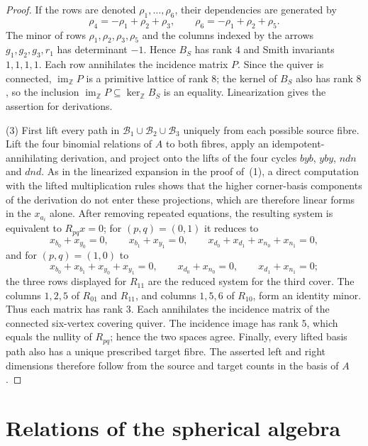 \documentclass[11pt]{amsart}
\theoremstyle{plain}
\theoremstyle{definition}
\newcommand{\ZZ}{\mathbb{Z}}
\begin{document}
\begin{proof}
If the rows are denoted $\rho_1,\ldots,\rho_6$, their dependencies are generated by
\[
 \rho_4=-\rho_1+\rho_2+\rho_3,\qquad \rho_6=-\rho_1+\rho_2+\rho_5.
\]
The minor of rows $\rho_1,\rho_2,\rho_3,\rho_5$ and the columns indexed by the arrows $g_1,g_2,g_3,r_1$ has
determinant $-1$. Hence $B_S$ has rank $4$ and Smith invariants $1,1,1,1$. Each row annihilates the incidence
matrix $P$. Since the quiver is connected, $\operatorname{im}_\ZZ P$ is a primitive lattice of rank $8$; the
kernel of $B_S$ also has rank $8$, so the inclusion $\operatorname{im}_\ZZ P\subseteq\ker_\ZZ B_S$ is an
equality. Linearization gives the assertion for derivations.

(3) First lift every path in $\mathcal B_1\cup\mathcal B_2\cup\mathcal B_3$ uniquely from each possible source
fibre. Lift the four binomial relations of $A$ to both fibres, apply an idempotent-annihilating derivation,
and project onto the lifts of the four cycles $byb$, $yby$, $ndn$ and $dnd$. As in the linearized expansion in
the proof of~(1), a direct computation with the lifted multiplication rules shows that the higher corner-basis
components of the derivation do not enter these projections, which are therefore linear forms in the $x_{a_i}$
alone. After removing repeated equations, the resulting system is equivalent to $R_{pq}x=0$; for $(p,q)=(0,1)$
it reduces to
\[
 x_{b_0}+x_{y_0}=0,\qquad x_{b_1}+x_{y_1}=0,\qquad
 x_{d_0}+x_{d_1}+x_{n_0}+x_{n_1}=0,
\]
and for $(p,q)=(1,0)$ to
\[
 x_{b_0}+x_{b_1}+x_{y_0}+x_{y_1}=0,\qquad
 x_{d_0}+x_{n_0}=0,\qquad x_{d_1}+x_{n_1}=0;
\]
the three rows displayed for $R_{11}$ are the reduced system for the third cover. The columns $1,2,5$ of
$R_{01}$ and $R_{11}$, and columns $1,5,6$ of $R_{10}$, form an identity minor. Thus each matrix has rank $3$.
Each annihilates the incidence matrix of the connected six-vertex covering quiver. The incidence image has
rank $5$, which equals the nullity of $R_{pq}$; hence the two spaces agree. Finally, every lifted basis path
also has a unique prescribed target fibre. The asserted left and right dimensions therefore follow from the
source and target counts in the basis of $A$.
\end{proof}

\section{Relations of the spherical algebra}\label{app:sph}
\end{document}
